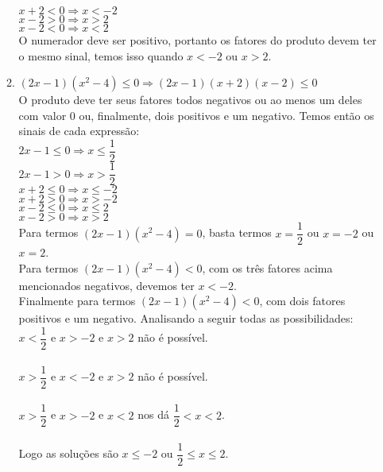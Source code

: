 \documentclass[10pt]{book}
\begin{document}
\begin{enumerate}
\begin{enumerate}
			$x + 2 < 0 \Rightarrow x < -2$\\
			$x - 2 > 0 \Rightarrow x > 2$\\
			$x - 2 < 0 \Rightarrow x < 2$\\
			O numerador deve ser positivo, portanto os fatores do produto devem ter o mesmo sinal, temos isso quando $x < -2$ ou $x > 2$.
			\item %
			$(2x - 1)(x^2 - 4) \leq 0 \Rightarrow (2x - 1)(x + 2)(x - 2) \leq 0$\\
			O produto deve ter seus fatores todos negativos ou ao menos um deles com valor 0 ou, finalmente, dois positivos e um negativo. Temos então os sinais de cada expressão:\\
			$2x - 1 \leq 0 \Rightarrow x \leq \dfrac{1}{2}$\\
			$2x - 1 > 0 \Rightarrow x > \dfrac{1}{2}$\\
			$x + 2 \leq 0 \Rightarrow x \leq -2$\\
			$x + 2 > 0 \Rightarrow x > -2$\\
			$x - 2 \leq 0 \Rightarrow x \leq 2$\\
			$x - 2 > 0 \Rightarrow x > 2$\\
			Para termos $(2x - 1)(x^2 - 4) = 0$, basta termos $x = \dfrac{1}{2}$ ou $x = -2$ ou $x = 2$.\\
			Para termos $(2x - 1)(x^2 - 4) < 0$, com os três fatores acima mencionados negativos, devemos ter $x < -2$.\\
			Finalmente para termos $(2x - 1)(x^2 - 4) < 0$, com dois fatores positivos e um negativo. Analisando a seguir todas as possibilidades:\\
			$x < \dfrac{1}{2}$ e $x > -2$ e $x > 2$ não é possível.\\\\
			$x > \dfrac{1}{2}$ e $x < -2$ e $x > 2$ não é possível.\\\\
			$x > \dfrac{1}{2}$ e $x > -2$ e $x < 2$ nos dá  $\dfrac{1}{2} < x < 2$.\\\\
			Logo as soluções são  $x \leq -2$ ou $\dfrac{1}{2} \leq x \leq 2$.
			

\end{enumerate}
\end{enumerate}
\end{document}
